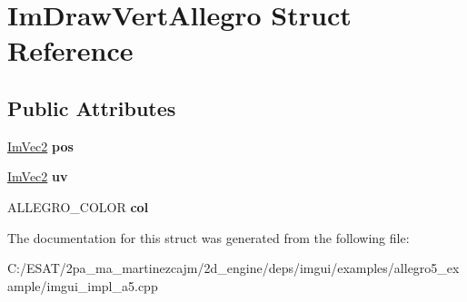 \hypertarget{struct_im_draw_vert_allegro}{}\section{Im\+Draw\+Vert\+Allegro Struct Reference}
\label{struct_im_draw_vert_allegro}
\subsection*{Public Attributes}
\begin{DoxyCompactItemize}
\item 
\mbox{\label{struct_im_draw_vert_allegro_a132358e0610fd1691a55101e6bb470eb}} 
\hyperlink{struct_im_vec2}{Im\+Vec2} {\bfseries pos}
\item 
\mbox{\label{struct_im_draw_vert_allegro_a99adeb37caaa0be78aa790522f3f0bfd}} 
\hyperlink{struct_im_vec2}{Im\+Vec2} {\bfseries uv}
\item 
\mbox{\label{struct_im_draw_vert_allegro_ac19aa852b9e406d90bc97ab41243a7db}} 
A\+L\+L\+E\+G\+R\+O\+\_\+\+C\+O\+L\+OR {\bfseries col}
\end{DoxyCompactItemize}


The documentation for this struct was generated from the following file\+:\begin{DoxyCompactItemize}
\item 
C\+:/\+E\+S\+A\+T/2pa\+\_\+ma\+\_\+martinezcajm/2d\+\_\+engine/deps/imgui/examples/allegro5\+\_\+example/imgui\+\_\+impl\+\_\+a5.\+cpp\end{DoxyCompactItemize}

